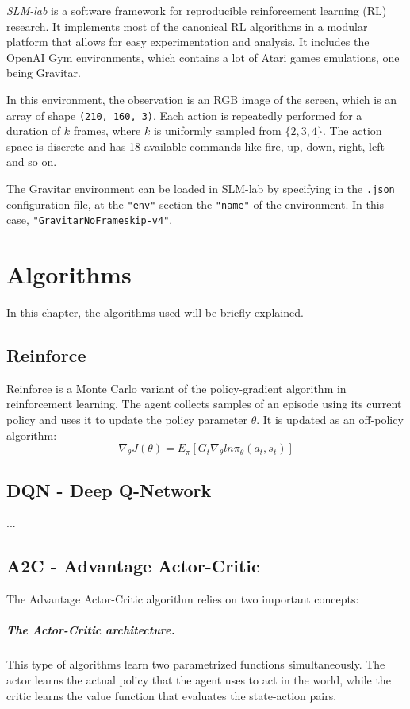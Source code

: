 \documentclass[12pt,a4paper]{report}
\begin{document}
		\emph{SLM-lab} \cite{kenggraesser2017slmlab} is a software framework for reproducible reinforcement learning (RL) research. It implements most of the canonical RL algorithms in a modular platform that allows for easy experimentation and analysis. It includes the OpenAI Gym \cite{brockman2016openai} environments, which contains a lot of Atari games emulations, one being Gravitar.
		
		In this environment, the observation is an RGB image of the screen, which is an array of shape \lstinline|(210, 160, 3)|. Each action is repeatedly performed for a duration of $k$ frames, where $k$ is uniformly sampled from $\{2, 3, 4\}$. The action space is discrete and has 18 available commands like fire, up, down, right, left and so on.
		
		The Gravitar environment can be loaded in SLM-lab by specifying in the \lstinline|.json| configuration file, at the \lstinline|"env"| section the \lstinline|"name"| of the environment. In this case, \lstinline|"GravitarNoFrameskip-v4"|. 
		
	\chapter{Algorithms}
		In this chapter, the algorithms used will be briefly explained.
		\section{Reinforce}
		Reinforce is a Monte Carlo variant of the policy-gradient algorithm in reinforcement learning. The agent collects samples of an episode using its current policy and uses it to update the policy parameter $\theta$. It is updated as an off-policy algorithm:
		\begin{equation}
			\nabla_\theta J(\theta) = E_\pi[G_t \nabla_\theta ln \pi_\theta(a_t, s_t)]
		\end{equation}  
		\section{DQN - Deep Q-Network}
		...
		\section{A2C - Advantage Actor-Critic}
		The Advantage Actor-Critic algorithm relies on two important concepts:
			\paragraph{The Actor-Critic architecture.} This type of algorithms learn two parametrized functions simultaneously. The actor learns the actual policy that the agent uses to act in the world, while the critic learns the value function that evaluates the state-action pairs.
			
\end{document}
